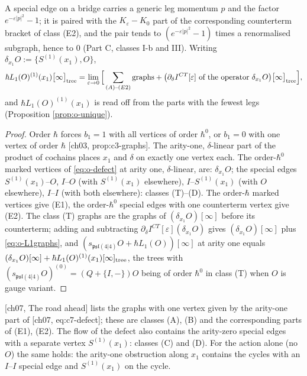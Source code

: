 \begin{theorem}
\begin{itemize}
\end{itemize}
A special edge on a bridge carries a generic leg momentum $p$ and the factor $e^{-\varepsilon|p|^2}-1$; it is paired with the $K_\varepsilon-K_0$ part of the corresponding counterterm bracket of class (E2), and the pair tends to $(e^{-\varepsilon|p|^2}-1)$ times a renormalised subgraph, hence to $0$ (Part C, classes I-b and III). Writing $\delta_{x_1}O:=\{S^{(1)}(x_1),O\}$,
\begin{equation}
\hbar L_1(O)^{(1)}(x_1)\big[\infty\big]_{\rm tree}=\lim_{\varepsilon\to0}\Big[\sum_{(A)\text{--}(E2)}\text{graphs}+\big(\partial_\delta I^{CT}[\varepsilon]\ \text{of the operator }\delta_{x_1}O\big)\big[\infty\big]_{\rm tree}\Big],
\label{eq:o-L1graphs}
\end{equation}
and $\hbar L_1(O)^{(1)}(x_1)$ is read off from the parts with the fewest legs (Proposition \ref{prop:o-unique}).
\end{theorem}

\begin{proof}
Order $\hbar$ forces $b_1=1$ with all vertices of order $\hbar^0$, or $b_1=0$ with one vertex of order $\hbar$ [ch03, prop:c3-graphs]. The arity-one, $\delta$-linear part of the product of cochains places $x_1$ and $\delta$ on exactly one vertex each. The order-$\hbar^0$ marked vertices of \eqref{eq:o-defect} at arity one, $\delta$-linear, are: $\delta_{x_1}O$; the special edges $S^{(1)}(x_1)$--$O$, $I$--$O$ (with $S^{(1)}(x_1)$ elsewhere), $I$--$S^{(1)}(x_1)$ (with $O$ elsewhere), $I$--$I$ (with both elsewhere): classes (T)--(D). The order-$\hbar$ marked vertices give (E1), the order-$\hbar^0$ special edges with one counterterm vertex give (E2). The class (T) graphs are the graphs of $(\delta_{x_1}O)[\infty]$ before its counterterm; adding and subtracting $\partial_\delta I^{CT}[\varepsilon](\delta_{x_1}O)$ gives $(\delta_{x_1}O)[\infty]$ plus \eqref{eq:o-L1graphs}, and $(s_{\mathfrak{psl}(4|4)}O+\hbar L_1(O))[\infty]$ at arity one equals $(\delta_{x_1}O)[\infty]+\hbar L_1(O)^{(1)}(x_1)[\infty]_{\rm tree}$, the trees with $(s_{\mathfrak{psl}(4|4)}O)^{(0)}=(Q+\{I,-\})O$ being of order $\hbar^0$ in class (T) when $O$ is gauge variant.
\end{proof}

\begin{remark}
\label{rem:o-roadahead}
[ch07, The road ahead] lists the graphs with one vertex given by the arity-one part of [ch07, eq:c7-defect]; these are classes (A), (B) and the corresponding parts of (E1), (E2). The flow of the defect also contains the arity-zero special edges with a separate vertex $S^{(1)}(x_1)$: classes (C) and (D). For the action alone (no $O$) the same holds: the arity-one obstruction along $x_1$ contains the cycles with an $I$--$I$ special edge and $S^{(1)}(x_1)$ on the cycle.
\end{remark}

